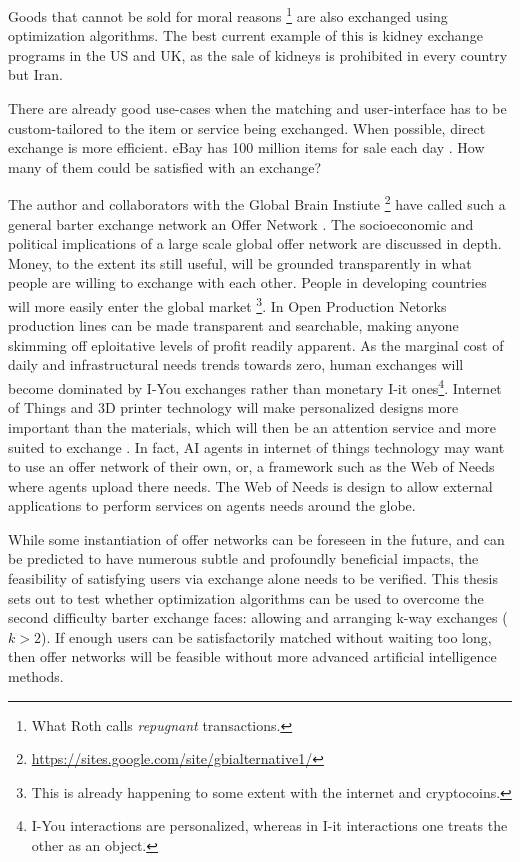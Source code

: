\documentclass[main.tex]{subfiles}
\begin{document}
Goods that cannot be sold for moral reasons \footnote{What Roth calls \textit{repugnant} transactions.}\cite{Rot3} are also exchanged using optimization algorithms. The best current example of this is kidney exchange programs in the US and UK, as the sale of kidneys is prohibited in every country but Iran.

There are already good use-cases when the matching and user-interface has to be custom-tailored to the item or service being exchanged. When possible, direct exchange is more efficient. eBay has 100 million items for sale each day \cite{ebay}. How many of them could be satisfied with an exchange?

The author and collaborators with the Global Brain Instiute \footnote{\url{https://sites.google.com/site/gbialternative1/}} have called such a general barter exchange network an Offer Network \cite{Goe1} \cite{Goe2} \cite{Hey1} \cite{Hey2}. The socioeconomic and political implications of a large scale global offer network are discussed in depth. Money, to the extent its still useful, will be grounded transparently in what people are willing to exchange with each other. People in developing countries will more easily enter the global market \footnote{This is already happening to some extent with the internet and cryptocoins.}. In Open Production Netorks \cite{Goe1} production lines can be made transparent and searchable, making anyone skimming off eploitative levels of profit readily apparent. As the marginal cost of daily and infrastructural needs trends towards zero, human exchanges will become dominated by I-You exchanges rather than monetary I-it ones\footnote{I-You interactions are personalized, whereas in I-it interactions one treats the other as an object.}. Internet of Things and 3D printer technology will make personalized designs more important than the materials, which will then be an attention service and more suited to exchange \cite{Hey1}. In fact, AI agents in internet of things technology may want to use an offer network of their own, or, a framework such as the Web of Needs \cite{Kle1} where agents upload there needs. The Web of Needs is design to allow external applications to perform services on agents needs around the globe.

While some instantiation of offer networks can be foreseen in the future, and can be predicted to have numerous subtle and profoundly beneficial impacts, the feasibility of satisfying users via exchange alone needs to be verified. This thesis sets out to test whether optimization algorithms can be used to overcome the second difficulty barter exchange faces: allowing and arranging k-way exchanges ($k>2$). If enough users can be satisfactorily matched without waiting too long, then offer networks will be feasible without more advanced artificial intelligence methods.
\end{document}
